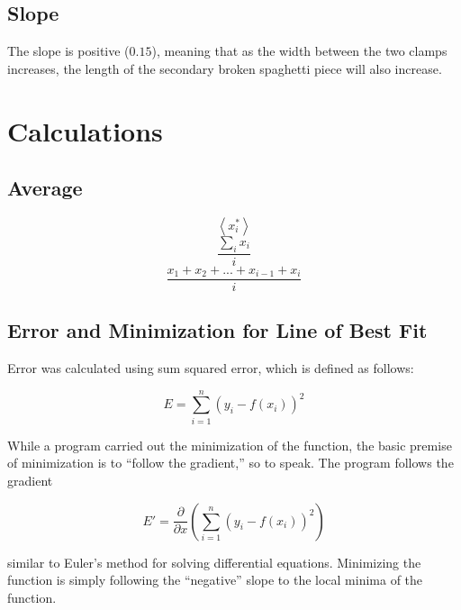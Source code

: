 \documentclass[a4paper]{article}
\def\mean#1{\left< #1 \right>}
\begin{document}
        \subsection{Slope}
            The slope is positive ($0.15$), meaning that as the width between the two clamps
            increases, the length of the secondary broken spaghetti piece will also increase.
    \section{Calculations}
        \subsection{Average}
            \begin{equation}
                \mean{x_i^*}
            \end{equation}
            \begin{equation}
                \frac{\displaystyle\sum_i{x_i}}{i}
            \end{equation}
            \begin{equation}
                \frac{x_1+x_2+...+x_{i-1}+x_i}{i}
            \end{equation}
        \subsection{Error and Minimization for Line of Best Fit}
            \centerline{Error was calculated using sum squared error, which is defined as follows:}
            \begin{equation}
                E=\displaystyle\sum_{i=1}^n{(y_i-f(x_i))^2}
            \end{equation}
            \begin{center}
                While a program carried out the minimization of the function, the basic
                premise of minimization is to ``follow the gradient,'' so to speak. The
                program follows the gradient
            \end{center}
            \begin{equation}
                E'=\frac{\partial}{\partial x}(\displaystyle\sum_{i=1}^n{(y_i-f(x_i))^2})
            \end{equation}
            \begin{center}
                similar to Euler's method for solving differential equations. Minimizing
                the function is simply following the ``negative'' slope to the local minima
                of the function.
            \end{center}
\end{document}
